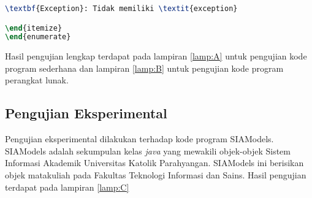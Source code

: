 \begin{lstlisting}[language=TeX, caption=Hasil Pengujian kode program perangkat lunak]
\textbf{Exception}: Tidak memiliki \textit{exception}

\end{itemize}
\end{enumerate}
\end{lstlisting}

Hasil pengujian lengkap terdapat pada lampiran \ref{lamp:A} untuk pengujian kode program sederhana dan lampiran \ref{lamp:B} untuk pengujian kode program perangkat lunak.

\subsection{Pengujian Eksperimental}
\label{sec:pengujian eksperimental}
Pengujian eksperimental dilakukan terhadap kode program SIAModels. SIAModels adalah sekumpulan kelas {\it java} yang mewakili objek-objek Sistem Informasi Akademik Universitas Katolik Parahyangan. SIAModels ini berisikan objek matakuliah pada Fakultas Teknologi Informasi dan Sains.  Hasil pengujian terdapat pada lampiran \ref{lamp:C}























